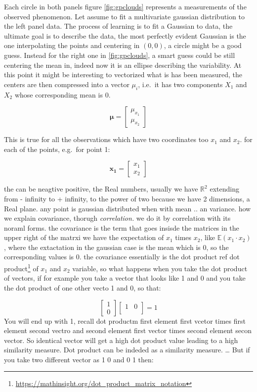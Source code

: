 \documentclass[
  12pt,
  a4paper,
  oneside]{book}
\DeclareRobustCommand{\href}[2]{#2\footnote{\url{#1}}}
\theoremstyle{definition}
\theoremstyle{definition}
\theoremstyle{definition}
\theoremstyle{remark}
\begin{document}
Each circle in both panels figure \ref{fig:gpclouds} represents a measurements of the observed phenomenon. Let assume to fit a multivariate gaussian distribution to the left panel data. The process of learning is to fit a Gaussian to data, the ultimate goal is to describe the data, the most perfectly evident Gaussian is the one interpolating the points and centering in \(\left(0,0\right)\), a circle might be a good guess. Instead for the right one in \ref{fig:gpclouds}, a smart guess could be still centering the mean in, indeed now it is an ellipse describing the variability.
At this point it might be interesting to vectorized what is has been measured, the centers are then compressed into a vector \(\mu_{i}\), i.e.~it has two components \(X_1\) and \(X_2\) whose corresponding mean is 0.

\[
\boldsymbol{\mu}=\left[\begin{array}{ll}
\mu_{x_1} \\
\mu_{x_2}
\end{array}\right]
\]

This is true for all the observations which have two coordinates too \(x_1\) and \(x_2\). for each of the points, e.g.~for point 1:

\[
\mathbf{x_1}=\left[\begin{array}{ll}
x_1 \\
x_2
\end{array}\right]
\]

the can be neagtive positive, the Real numbers, usually we have \(\mathbb{R}^{2}\) extending from - infinity to + infinity, to the power of two because we have 2 dimensions, a Real plane.
any point is gaussian distributed when with mean .. an variance.
how we explain covariance, thorugh \emph{correlation.}
we do it by correlation with its noraml forms. the covariance is the term that goes insisde the matrices in the upper right of the matrxi we have the expectation of \(x_1\) times \(x_2\), like \(\mathbb{E}(x_1 \cdot x_2)\), where the extactation in the gaussian case is the mean which is 0, so the corresponding values is 0.
the covariance essentially is the dot product \href{https://mathinsight.org/dot_product_matrix_notation}{ref dot product} of \(x_1\) and \(x_2\) variable, so what happens when you take the dot product of vectors,
if for example you take a vector that looks like 1 and 0 and you take the dot product of one other vecto 1 and 0, so that:

\[
\left[\begin{array}{ll}
1 \\
0
\end{array}\right]\left[\begin{array}{ll}
1 & 0 \\
\end{array}\right] = 1
\]
You will end up with 1, recall dot productm first element first vcetor times first element second vectro and second element first vector times second element secon vector. So identical vector will get a high dot product value leading to a high similarity measure. Dot product can be indeded as a similarity measure.
\ldots{} But if you take two different vector as 1 0 and 0 1 then:
\end{document}
